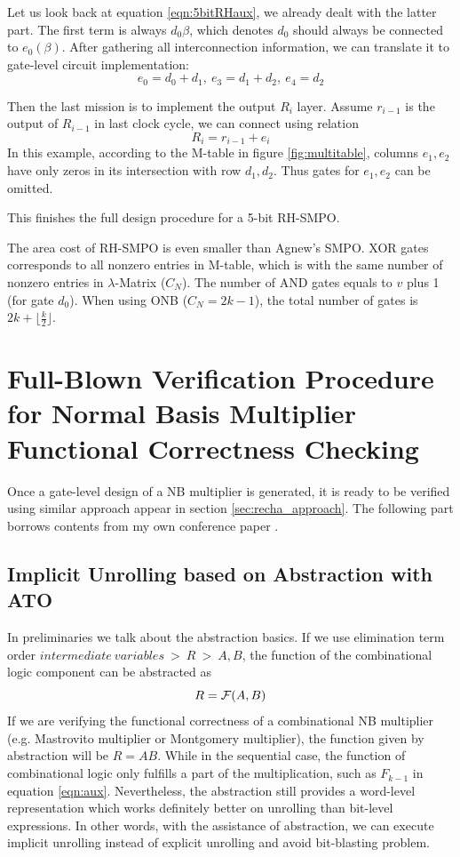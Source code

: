 \begin{Example}
Let us look back at equation \ref{eqn:5bitRHaux}, we already dealt with the latter part.
The first term is always $d_0\beta$, which denotes $d_0$ should always be connected to $e_0(\beta)$.
After gathering all interconnection information, we can translate it to gate-level circuit implementation:
$$e_0 = d_0+d_1,~e_3=d_1+d_2,~e_4=d_2$$

Then the last mission is to implement the output $R_i$ layer. Assume $r_{i-1}$ is the output of 
$R_{i-1}$ in last clock cycle, we can connect using relation 
$$R_i = r_{i-1} + e_i$$
In this example, according to the M-table in figure \ref{fig:multitable}, columns $e_1,e_2$
have only zeros in its intersection with row $d_1,d_2$. Thus gates for $e_1,e_2$ can be omitted.

This finishes the full design procedure for a 5-bit RH-SMPO.
\end{Example}

The area cost of RH-SMPO is even smaller than Agnew's SMPO. XOR gates corresponds to all nonzero entries 
in M-table, which is with the same number of nonzero entries in $\lambda$-Matrix ($C_N$). The number of AND gates 
equals to $v$ plus 1 (for gate $d_0$). When using ONB ($C_N = 2k-1$), the total number of gates 
is $2k+\lfloor \frac{k}{2}\rfloor$.

\section{Full-Blown Verification Procedure for Normal Basis Multiplier Functional Correctness Checking}
Once a gate-level design of a NB multiplier is generated, it is ready to be verified using 
similar approach appear in section \ref{sec:recha_approach}. The following part borrows contents
from my own conference paper \cite{myDATE}.
\subsection{Implicit Unrolling based on Abstraction with ATO}
In preliminaries we talk about the abstraction basics. If we use elimination term order 
$intermediate~variables~>~R~>~A,B$, the function of the combinational logic component 
can be abstracted as 
$$R = {\mathcal{F}}(A,B)$$
If we are verifying the functional correctness of a combinational NB multiplier (e.g. Mastrovito multiplier
or Montgomery multiplier), the function given by abstraction will be $R=AB$.
While in the sequential case, the function of combinational logic only fulfills a part of the multiplication,
such as $F_{k-1}$ in equation \ref{eqn:aux}. Nevertheless, the abstraction still provides a word-level 
representation which works definitely better on unrolling than bit-level expressions.
In other words, with the assistance of abstraction, we can execute implicit unrolling instead of 
explicit unrolling and avoid bit-blasting problem.

